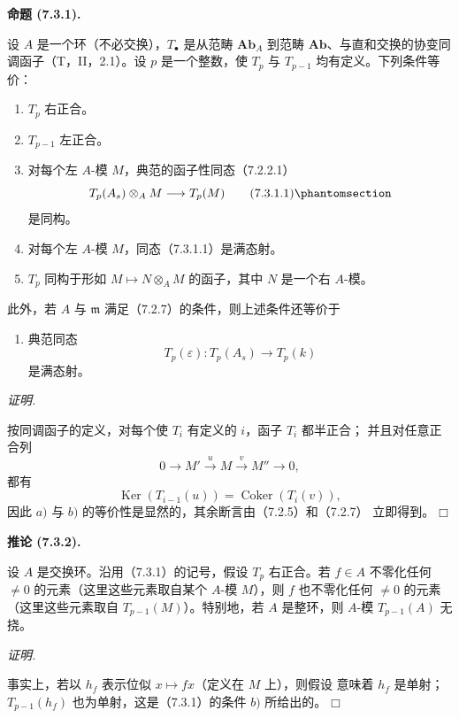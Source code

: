 \documentclass[UTF8,fontset=none,11pt,oneside,openany]{ctexbook}
\providecommand{\square}{\mdlgwhtsquare}
\newenvironment{proposition}[1][]{%
  \par\medskip\noindent\textbf{命题 (#1).}\ %
}{\par}
\newenvironment{corollary}[1][]{%
  \par\medskip\noindent\textbf{推论 (#1).}\ %
}{\par}
\newenvironment{proof}{%
  \par\smallskip\noindent\textit{证明.}\ %
}{\hfill$\square$\par}
\newcommand{\oldpage}[2][]{%
  \hypertarget{ega-source-page-#1-#2}{}%
  \marginnote{\scriptsize\textbf{#1}~|~#2}\ignorespaces}
\let\EGAOriginalLabel\label
\renewcommand{\label}[1]{\phantomsection\EGAOriginalLabel{#1}}
\begin{document}
\begin{proposition}[7.3.1]
设 $A$ 是一个环（不必交换），$T_\bullet$ 是从范畴 $\mathbf{Ab}_A$
到范畴 $\mathbf{Ab}$、与直和交换的协变同调函子（T，II，2.1）。设
$p$ 是一个整数，使 $T_p$ 与 $T_{p-1}$ 均有定义。下列条件等价：
\begin{enumerate}
  \item[a)] $T_p$ 右正合。
  \item[b)] $T_{p-1}$ 左正合。
  \oldpage[III]{181}
  \item[c)] 对每个左 $A$-模 $M$，典范的函子性同态（7.2.2.1）
    \[
      T_p(A_s)\otimes_A M\longrightarrow T_p(M)
      \tag{7.3.1.1}\label{III.7.3.1.1.fr}
    \]
    是同构。
  \item[d)] 对每个左 $A$-模 $M$，同态（7.3.1.1）是满态射。
  \item[e)] $T_p$ 同构于形如
    $M\mapsto N\otimes_A M$ 的函子，其中 $N$ 是一个右 $A$-模。
\end{enumerate}
此外，若 $A$ 与 $\mathfrak m$ 满足（7.2.7）的条件，则上述条件还等价于
\begin{enumerate}
  \item[f)] 典范同态
    \[
      T_p(\varepsilon):T_p(A_s)\longrightarrow T_p(k)
    \]
    是满态射。
\end{enumerate}
\end{proposition}

\begin{proof}
按同调函子的定义，对每个使 $T_i$ 有定义的 $i$，函子 $T_i$ 都半正合；
并且对任意正合列
\[
  0\longrightarrow M'\xrightarrow{u}M\xrightarrow{v}M''\longrightarrow0,
\]
都有
\[
  \operatorname{Ker}(T_{i-1}(u))
  =
  \operatorname{Coker}(T_i(v)),
\]
因此 $a)$ 与 $b)$ 的等价性是显然的，其余断言由（7.2.5）和（7.2.7）
立即得到。
\end{proof}

\begin{corollary}[7.3.2]
设 $A$ 是交换环。沿用（7.3.1）的记号，假设 $T_p$ 右正合。若
$f\in A$ 不零化任何 $\ne0$ 的元素（这里这些元素取自某个 $A$-模
$M$），则 $f$ 也不零化任何 $\ne0$ 的元素（这里这些元素取自
$T_{p-1}(M)$）。特别地，若 $A$ 是整环，则 $A$-模
$T_{p-1}(A)$ 无挠。
\end{corollary}

\begin{proof}
事实上，若以 $h_f$ 表示位似 $x\mapsto fx$（定义在 $M$ 上），则假设
意味着 $h_f$ 是单射；$T_{p-1}(h_f)$ 也为单射，这是（7.3.1）的条件
$b)$ 所给出的。
\end{proof}
\end{document}
